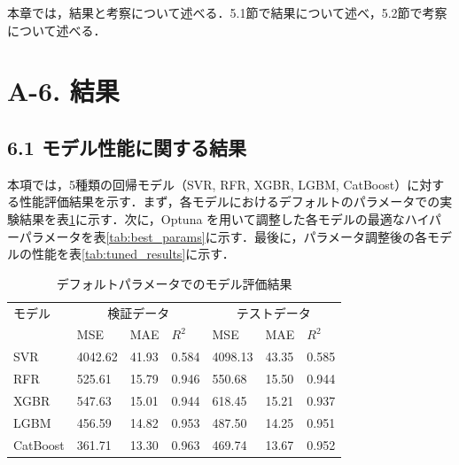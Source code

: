 本章では，結果と考察について述べる．5.1節で結果について述べ，5.2節で考察について述べる．

\section*{A-6. 結果}

\subsection*{6.1 モデル性能に関する結果}
本項では，5種類の回帰モデル（SVR, RFR, XGBR, LGBM, CatBoost）に対する性能評価結果を示す．まず，各モデルにおけるデフォルトのパラメータでの実験結果を表\ref{tab:default_results}に示す．次に，Optuna を用いて調整した各モデルの最適なハイパーパラメータを表\ref{tab:best_params}に示す．最後に，パラメータ調整後の各モデルの性能を表\ref{tab:tuned_results}に示す．

\begin{table}[htbp]
    \centering
    \doublerulesep=0.3pt
    \caption{デフォルトパラメータでのモデル評価結果}
    \label{tab:default_results}
    \begin{tabular}{l|p{0.8cm}p{0.8cm}p{0.8cm}|p{0.8cm}p{0.8cm}p{0.8cm}}
        \hline\hline\hline
        モデル & \multicolumn{3}{c|}{検証データ} & \multicolumn{3}{c}{テストデータ} \\
               & MSE & MAE & $R^2$ & MSE & MAE & $R^2$ \\
        \hline
        SVR       & 4042.62 & 41.93 & 0.584 & 4098.13 & 43.35 & 0.585 \\
        RFR       & 525.61  & 15.79 & 0.946 & 550.68  & 15.50 & 0.944 \\
        XGBR      & 547.63  & 15.01 & 0.944 & 618.45  & 15.21 & 0.937 \\
        LGBM      & 456.59  & 14.82 & 0.953 & 487.50  & 14.25 & 0.951 \\
        CatBoost  & 361.71  & 13.30 & 0.963 & 469.74  & 13.67 & 0.952 \\
        \hline\hline\hline
    \end{tabular}
\end{table}

